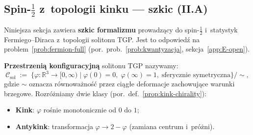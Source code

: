 \subsection{Spin-$\tfrac{1}{2}$ z~topologii kinku --- szkic (II.A)}%
\label{app:E-spin-half}

Niniejsza sekcja zawiera \textbf{szkic formalizmu} prowadz\k{a}cy
do spin-$\tfrac{1}{2}$ i~statystyk Fermiego--Diraca z~topologii
solitonu TGP.
Jest to odpowied\'z na problem~\ref{prob:fermion-full}
(por.\ prob.~\ref{prob:kwantyzacja}, sekcja~\ref{app:E-open}).

\begin{definition}%
\label{def:kink-config-space}
\textbf{Przestrzeni\k{a} konfiguracyjn\k{a}} solitonu TGP nazywamy:
\begin{equation}\label{eq:kink-config}
  \mathcal{C}_{\mathrm{sol}}
  \;:=\;
  \bigl\{
    \varphi : \mathbb{R}^3 \to [0,\infty)
    \;\big|\;
    \varphi(0) = 0,\;
    \varphi(\infty) = 1,\;
    \text{sferycznie symetryczna}
  \bigr\} \!\big/ \!\sim,
\end{equation}
gdzie $\sim$ oznacza r\'ownowa\.zno\'s\'c przez ci\k{a}g\l{}e deformacje
zachowuj\k{a}ce warunki brzegowe.
Rozr\'o\.zniamy dwie klasy (por.\ def.~\ref{prop:kink-chirality}):
\begin{itemize}[nosep]
  \item \textbf{Kink}: $\varphi$ ro\'snie monotonicznie od $0$ do $1$;
  \item \textbf{Antykink}: transformacja $\varphi \to 2 - \varphi$
    (zamiana centrum i~pr\'o\.zni).
\end{itemize}
\end{definition}

